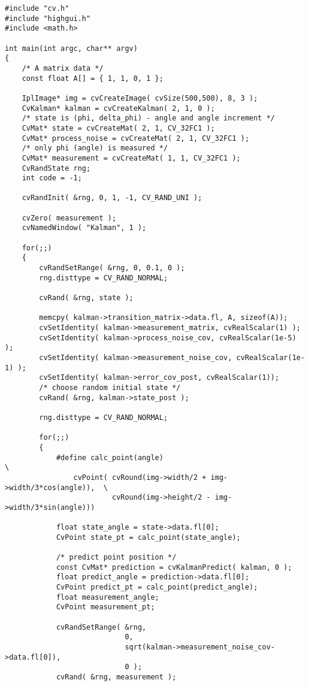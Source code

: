\ifC
{}
\begin{lstlisting}
#include "cv.h"
#include "highgui.h"
#include <math.h>

int main(int argc, char** argv)
{
    /* A matrix data */
    const float A[] = { 1, 1, 0, 1 };

    IplImage* img = cvCreateImage( cvSize(500,500), 8, 3 );
    CvKalman* kalman = cvCreateKalman( 2, 1, 0 );
    /* state is (phi, delta_phi) - angle and angle increment */
    CvMat* state = cvCreateMat( 2, 1, CV_32FC1 );
    CvMat* process_noise = cvCreateMat( 2, 1, CV_32FC1 );
    /* only phi (angle) is measured */
    CvMat* measurement = cvCreateMat( 1, 1, CV_32FC1 );
    CvRandState rng;
    int code = -1;

    cvRandInit( &rng, 0, 1, -1, CV_RAND_UNI );

    cvZero( measurement );
    cvNamedWindow( "Kalman", 1 );

    for(;;)
    {
        cvRandSetRange( &rng, 0, 0.1, 0 );
        rng.disttype = CV_RAND_NORMAL;

        cvRand( &rng, state );

        memcpy( kalman->transition_matrix->data.fl, A, sizeof(A));
        cvSetIdentity( kalman->measurement_matrix, cvRealScalar(1) );
        cvSetIdentity( kalman->process_noise_cov, cvRealScalar(1e-5) );
        cvSetIdentity( kalman->measurement_noise_cov, cvRealScalar(1e-1) );
        cvSetIdentity( kalman->error_cov_post, cvRealScalar(1));
        /* choose random initial state */
        cvRand( &rng, kalman->state_post );

        rng.disttype = CV_RAND_NORMAL;

        for(;;)
        {
            #define calc_point(angle)                                      \
                cvPoint( cvRound(img->width/2 + img->width/3*cos(angle)),  \
                         cvRound(img->height/2 - img->width/3*sin(angle)))

            float state_angle = state->data.fl[0];
            CvPoint state_pt = calc_point(state_angle);

            /* predict point position */
            const CvMat* prediction = cvKalmanPredict( kalman, 0 );
            float predict_angle = prediction->data.fl[0];
            CvPoint predict_pt = calc_point(predict_angle);
            float measurement_angle;
            CvPoint measurement_pt;

            cvRandSetRange( &rng,
                            0,
                            sqrt(kalman->measurement_noise_cov->data.fl[0]),
                            0 );
            cvRand( &rng, measurement );


\end{lstlisting}

